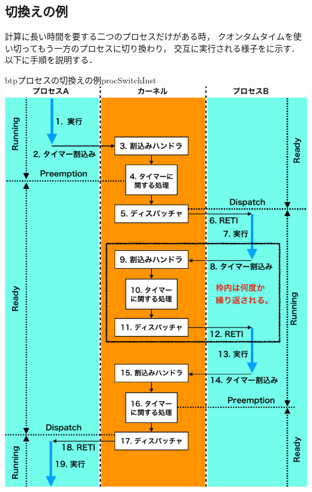 \subsection{切換えの例}
計算に長い時間を要する二つのプロセスだけがある時，
クオンタムタイムを使い切ってもう一方のプロセスに切り換わり，
交互に実行される様子をに示す．
以下に手順を説明する．

\begin{myfig}{btp}{プロセスの切換えの例}{procSwitchInst}
  \includegraphics[scale=0.6]{Fig/procSwitchInst-crop.pdf}
\end{myfig}

